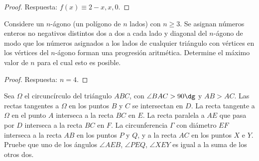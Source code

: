 \begin{proof}
	Respuesta: $f(x)\equiv 2-x,x,0$.
\end{proof}

\begin{probEG}
	Considere un $n$-ágono (un polígono de $n$ lados) con $n\ge 3$. Se asignan números enteros no negativos distintos dos a dos a cada lado y diagonal del $n$-ágono de modo que los números asignados a los lados de cualquier triángulo con vértices en los vértices del $n$-ágono forman una progresión aritmética. Determine el máximo valor de $n$ para el cual esto es posible.
\end{probEG}

\begin{proof}
	Respuesta: $n=4$.
\end{proof}

\begin{probMB}
	Sea $\Omega$ el circuncírculo del triángulo $ABC$, con $\angle BAC>90\dg$ y $AB>AC$. Las rectas tangentes a $\Omega$ en los puntos $B$ y $C$ se intersectan en $D$. La recta tangente a $\Omega$ en el punto $A$ interseca a la recta $BC$ en $E$. La recta paralela a $AE$ que pasa por $D$ interseca a la recta $BC$ en $F$. La circunferencia $\Gamma$ con diámetro $EF$ interseca a la recta $AB$ en los puntos $P$ y $Q$, y a la recta $AC$ en los puntos $X$ e $Y$. Pruebe que uno de los ángulos $\angle AEB$, $\angle PEQ$, $\angle XEY$ es igual a la suma de los otros dos.
\end{probMB}

